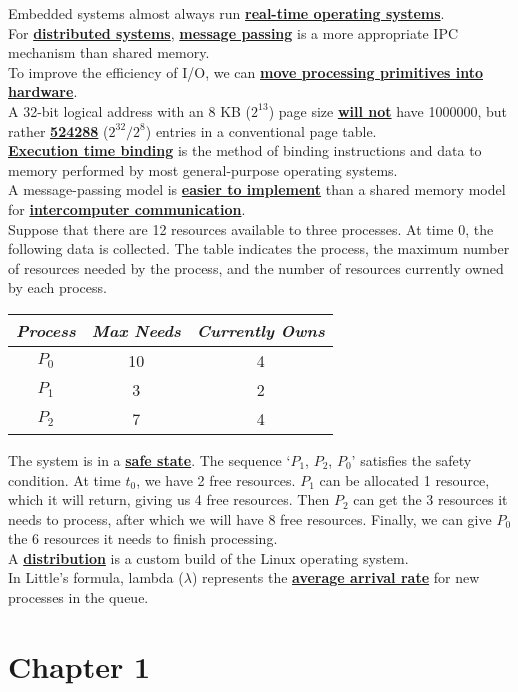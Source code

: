 \documentclass[10pt]{article}
\newcommand{\qw}[1]{\textbf{\ul{#1}}}
\begin{document}
Embedded systems almost always run \qw{real-time operating systems}.\\[2mm]
For \qw{distributed systems}, \qw{message passing} is a more appropriate IPC mechanism than shared memory.\\[2mm]
To improve the efficiency of I/O, we can \qw{move processing primitives into hardware}.\\[2mm]
A 32-bit logical address with an 8 KB ($2^13$) page size \qw{will not} have 1000000, but rather \qw{524288} ($2^{32}/2^8$) entries in a conventional page table.\\[2mm]
\qw{Execution time binding} is the method of binding instructions and data to memory performed by most general-purpose operating systems.\\[2mm]
A message-passing model is \qw{easier to implement} than a shared memory model for \qw{intercomputer communication}.\\[2mm]
Suppose that there are 12 resources available to three processes. At time 0, the following data is collected. The table indicates the process, the maximum number of resources needed by the process, and the number of resources currently owned by each process.\\
\begin{table}[]
\centering
\begin{tabular}{ccc}
\textit{Process} & \textit{Max Needs} & \textit{Currently Owns} \\ \hline
$P_0$ & 10 & 4 \\
$P_1$ & 3 & 2 \\
$P_2$ & 7 & 4
\end{tabular}
\end{table}
The system is in a \qw{safe state}. The sequence `$P_1$, $P_2$, $P_0$' satisfies the safety condition.
At time $t_0$, we have 2 free resources. $P_1$ can be allocated 1 resource, 
which it will return, giving us 4 free resources. Then $P_2$ can get the 3 resources it needs to process,
after which we will have 8 free resources. Finally, we can give $P_0$ the 6 resources it needs to finish processing.\\[2mm]
A \qw{distribution} is a custom build of the Linux operating system.\\[2mm]
In Little's formula, lambda ($\lambda$) represents the \qw{average arrival rate} for new processes in the queue.\\[2mm]

\section{Chapter 1}\newpage
\end{document}
